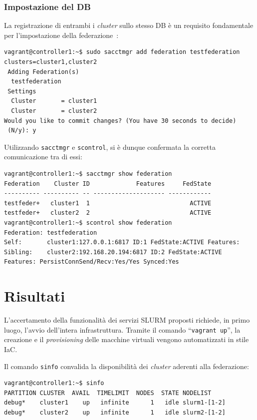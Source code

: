 \documentclass[12pt,a4paper,twoside,openright]{book}
\begin{document}
\subsection{Impostazione del DB}
La registrazione di entrambi i \textit{cluster} sullo stesso \ac{DB} è un requisito fondamentale per l'impostazione della federazione~\cite{slurmfederation}:
\begin{verbatim}
vagrant@controller1:~$ sudo sacctmgr add federation testfederation clusters=cluster1,cluster2
 Adding Federation(s)
  testfederation
 Settings
  Cluster       = cluster1
  Cluster       = cluster2
Would you like to commit changes? (You have 30 seconds to decide)
 (N/y): y
\end{verbatim}
Utilizzando \texttt{sacctmgr} e \texttt{scontrol}, si è dunque confermata la corretta comunicazione tra di essi:
\begin{verbatim}
vagrant@controller1:~$ sacctmgr show federation
Federation    Cluster ID             Features     FedState
---------- ---------- -- -------------------- ------------
testfeder+   cluster1  1                            ACTIVE
testfeder+   cluster2  2                            ACTIVE
vagrant@controller1:~$ scontrol show federation
Federation: testfederation
Self:       cluster1:127.0.0.1:6817 ID:1 FedState:ACTIVE Features:
Sibling:    cluster2:192.168.20.194:6817 ID:2 FedState:ACTIVE Features: PersistConnSend/Recv:Yes/Yes Synced:Yes
\end{verbatim}


\chapter{Risultati} %
L'accertamento della funzionalità dei servizi \ac{SLURM} proposti richiede, in primo luogo, l'avvio dell'intera infrastruttura. Tramite il comando ``\texttt{vagrant up}'', la creazione e il \textit{provisioning} delle macchine virtuali vengono automatizzati in stile \acf{IaC}.

Il comando \texttt{sinfo} convalida la disponibilità dei \textit{cluster} aderenti alla federazione:
\begin{verbatim}
vagrant@controller1:~$ sinfo
PARTITION CLUSTER  AVAIL  TIMELIMIT  NODES  STATE NODELIST
debug*    cluster1    up   infinite      1   idle slurm1-[1-2]
debug*    cluster2    up   infinite      1   idle slurm2-[1-2]
\end{verbatim}
\end{document}
